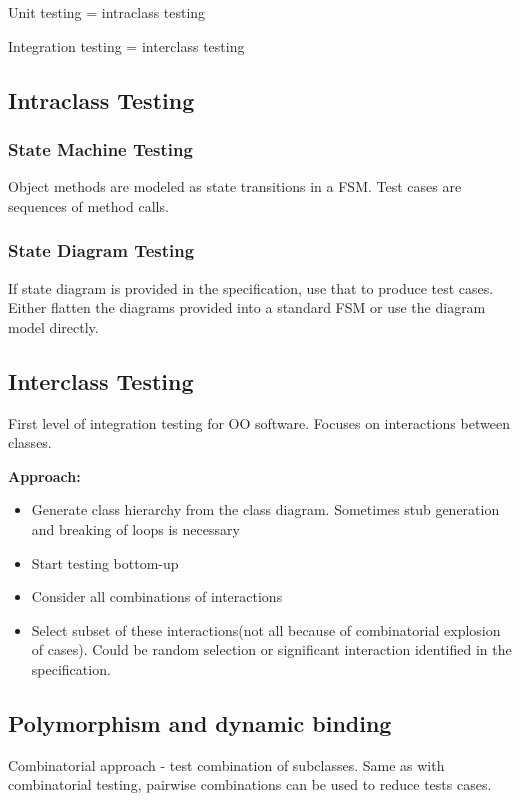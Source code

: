 \documentclass{article}
\begin{document}
Unit testing = intraclass testing

Integration testing = interclass testing

\subsection{Intraclass Testing}

\subsubsection{State Machine Testing}
Object methods are modeled as state transitions in a FSM. Test cases are sequences of method calls.

\subsubsection{State Diagram Testing}
If state diagram is provided in the specification, use that to produce test cases. Either flatten the diagrams provided into a standard FSM or use the diagram model directly.

\subsection{Interclass Testing}

First level of integration testing for OO software. Focuses on interactions between classes.

\textbf{Approach:}
\begin{itemize}
 \item Generate class hierarchy from the class diagram. Sometimes stub generation and breaking of loops is necessary
  \item Start testing bottom-up
  \item  Consider all combinations of interactions
  \item  Select subset of these interactions(not all because of combinatorial explosion of cases). Could be random selection or significant interaction identified in the specification.
\end{itemize}

\subsection{Polymorphism and dynamic binding}
Combinatorial approach - test combination of subclasses. Same as with combinatorial testing, pairwise combinations can be used to reduce tests cases.
\end{document}
